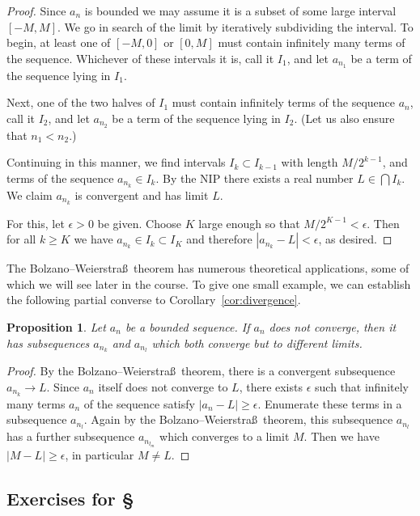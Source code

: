 \documentclass[11pt,oneside]{amsbook}
\theoremstyle{definition}
\theoremstyle{plain}
\newtheorem{prop}[thm]{Proposition}
\theoremstyle{definition}
\theoremstyle{remark}
\numberwithin{equation}{section}
\numberwithin{figure}{section}
\begin{document}
\begin{proof}
  Since $a_n$ is bounded we may assume it is a subset of some large interval $[-M,M]$. We go in search of the limit by iteratively subdividing the interval. To begin, at least one of $[-M,0]$ or $[0,M]$ must contain infinitely many terms of the sequence. Whichever of these intervals it is, call it $I_1$, and let $a_{n_1}$ be a term of the sequence lying in $I_1$.

  Next, one of the two halves of $I_1$ must contain infinitely terms of the sequence $a_n$, call it $I_2$, and let $a_{n_2}$ be a term of the sequence lying in $I_2$. (Let us also ensure that $n_1<n_2$.)

  Continuing in this manner, we find intervals $I_k\subset I_{k-1}$ with length $M/2^{k-1}$, and terms of the sequence $a_{n_k}\in I_k$. By the NIP there exists a real number $L\in\bigcap I_k$. We claim $a_{n_k}$ is convergent and has limit $L$.

  For this, let $\epsilon>0$ be given. Choose $K$ large enough so that $M/2^{K-1}<\epsilon$. Then for all $k\geq K$ we have $a_{n_k}\in I_k\subset I_K$ and therefore $|a_{n_k}-L|<\epsilon$, as desired.
\end{proof}

The Bolzano--Weierstra\ss\ theorem has numerous theoretical applications, some of which we will see later in the course. To give one small example, we can establish the following partial converse to Corollary~\ref{cor:divergence}.

\begin{prop}
  Let $a_n$ be a bounded sequence. If $a_n$ does not converge, then it has subsequences $a_{n_k}$ and $a_{n_l}$ which both converge but to different limits.
\end{prop}

\begin{proof}
  By the Bolzano--Weierstra\ss\ theorem, there is a convergent subsequence $a_{n_k}\to L$. Since $a_n$ itself does not converge to $L$, there exists $\epsilon$ such that infinitely many terms $a_n$ of the sequence satisfy $|a_n-L|\geq\epsilon$. Enumerate these terms in a subsequence $a_{n_l}$. Again by the Bolzano--Weierstra\ss\ theorem, this subsequence $a_{n_l}$ has a further subsequence $a_{n_{l_m}}$ which converges to a limit $M$. Then we have $|M-L|\geq\epsilon$, in particular $M\neq L$.
\end{proof}

\newpage
\subsection*{Exercises for \S \thesection}
\end{document}
